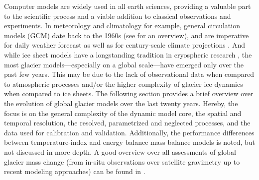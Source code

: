 
    Computer models are widely used in all earth sciences, providing a valuable part to the scientific process and a viable addition to classical observations and experiments. In meteorology and climatology for example, general circulation models (GCM) date back to the 1960s (see \citep{Williamson2007} for an overview), and are imperative for daily weather forecast as well as for century-scale climate projections \citep[e.g.,][]{Cote2015, Lauritzen2011}. And while ice sheet models have a longstanding tradition in cryospheric research \citep[e.g.,][]{Pattyn2012, Nowicki2016}, the most glacier models---especially on a global scale---have emerged only over the past few years. This may be due to the lack of observational data when compared to atmospheric processes and/or the higher complexity of glacier ice dynamics when compared to ice sheets. The following section provides a brief overview over the evolution of global glacier models over the last twenty years. Hereby, the focus is on the general complexity of the dynamic model core, the spatial and temporal resolution, the resolved, parametrized and neglected processes, and the data used for calibration and validation. Additionally, the performance differences between temperature-index and energy balance mass balance models is noted, but not discussed in more depth. A good overview over all assessments of global glacier mass change (from in-situ observations over satellite gravimetry up to recent modeling approaches) can be found in \citet{Radic2014}.

